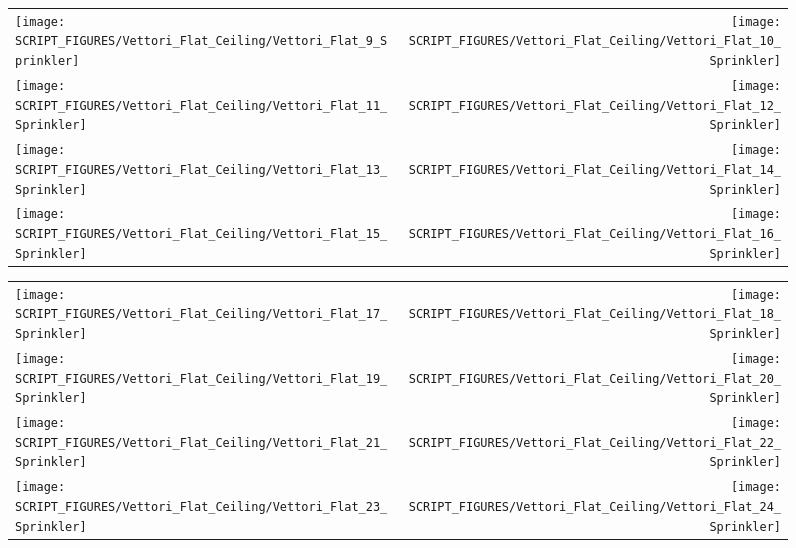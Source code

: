 \begin{figure}[p]
\begin{tabular*}{\textwidth}{l@{\extracolsep{\fill}}r}
\texttt{[image: SCRIPT\_FIGURES/Vettori\_Flat\_Ceiling/Vettori\_Flat\_9\_Sprinkler]} &
\texttt{[image: SCRIPT\_FIGURES/Vettori\_Flat\_Ceiling/Vettori\_Flat\_10\_Sprinkler]} \\
\texttt{[image: SCRIPT\_FIGURES/Vettori\_Flat\_Ceiling/Vettori\_Flat\_11\_Sprinkler]} &
\texttt{[image: SCRIPT\_FIGURES/Vettori\_Flat\_Ceiling/Vettori\_Flat\_12\_Sprinkler]} \\
\texttt{[image: SCRIPT\_FIGURES/Vettori\_Flat\_Ceiling/Vettori\_Flat\_13\_Sprinkler]} &
\texttt{[image: SCRIPT\_FIGURES/Vettori\_Flat\_Ceiling/Vettori\_Flat\_14\_Sprinkler]} \\
\texttt{[image: SCRIPT\_FIGURES/Vettori\_Flat\_Ceiling/Vettori\_Flat\_15\_Sprinkler]} &
\texttt{[image: SCRIPT\_FIGURES/Vettori\_Flat\_Ceiling/Vettori\_Flat\_16\_Sprinkler]}
\end{tabular*}
\end{figure}

\begin{figure}[p]
\begin{tabular*}{\textwidth}{l@{\extracolsep{\fill}}r}
\texttt{[image: SCRIPT\_FIGURES/Vettori\_Flat\_Ceiling/Vettori\_Flat\_17\_Sprinkler]} &
\texttt{[image: SCRIPT\_FIGURES/Vettori\_Flat\_Ceiling/Vettori\_Flat\_18\_Sprinkler]} \\
\texttt{[image: SCRIPT\_FIGURES/Vettori\_Flat\_Ceiling/Vettori\_Flat\_19\_Sprinkler]} &
\texttt{[image: SCRIPT\_FIGURES/Vettori\_Flat\_Ceiling/Vettori\_Flat\_20\_Sprinkler]} \\
\texttt{[image: SCRIPT\_FIGURES/Vettori\_Flat\_Ceiling/Vettori\_Flat\_21\_Sprinkler]} &
\texttt{[image: SCRIPT\_FIGURES/Vettori\_Flat\_Ceiling/Vettori\_Flat\_22\_Sprinkler]} \\
\texttt{[image: SCRIPT\_FIGURES/Vettori\_Flat\_Ceiling/Vettori\_Flat\_23\_Sprinkler]} &
\texttt{[image: SCRIPT\_FIGURES/Vettori\_Flat\_Ceiling/Vettori\_Flat\_24\_Sprinkler]}
\end{tabular*}
\end{figure}

